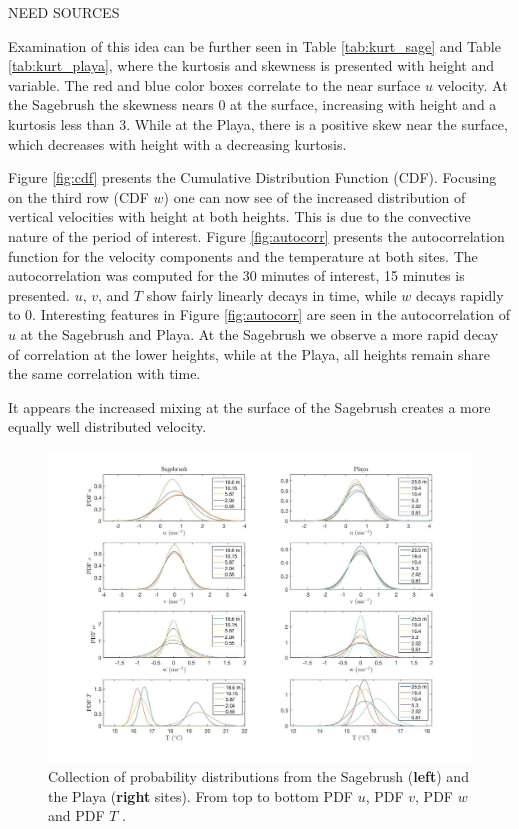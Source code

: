 \documentclass[]{article}
\begin{document}
NEED SOURCES

Examination of this idea can be further seen in Table \ref{tab:kurt_sage} and Table \ref{tab:kurt_playa}, where the kurtosis and skewness is presented with height and variable. The red and blue color boxes correlate to the near surface $u$ velocity. At the Sagebrush the skewness nears 0 at the surface, increasing with height and a kurtosis less than 3. While at the Playa, there is a positive skew near the surface, which decreases with height with a decreasing kurtosis. 

Figure \ref{fig:cdf} presents the Cumulative Distribution Function (CDF). Focusing on the third row (CDF $w$) one can now see of the increased distribution of vertical velocities with height at both heights. This is due to the convective nature of the period of interest. Figure \ref{fig:autocorr} presents the autocorrelation function for the velocity components and the temperature at both sites. The autocorrelation was computed for the 30 minutes of interest, 15 minutes is presented. $u$, $v$, and $T$ show fairly linearly decays in time, while $w$ decays rapidly to 0. Interesting features in Figure \ref{fig:autocorr} are seen in the autocorrelation of $u$ at the Sagebrush and Playa. At the Sagebrush we observe a more rapid decay of correlation at the lower heights, while at the Playa, all heights remain share the same correlation with time. 

It appears the increased mixing at the surface of the Sagebrush creates a more equally well distributed velocity. 



\begin{figure}
	\centering
	\includegraphics[width=\textwidth]{pdf}
	\caption{Collection of probability distributions from the Sagebrush (\textbf{left}) and the Playa (\textbf{right} sites). From top to bottom PDF $u$, PDF $v$,  PDF $w$ and PDF $T$ . }
	\label{fig:pdf}
\end{figure}
\end{document}
